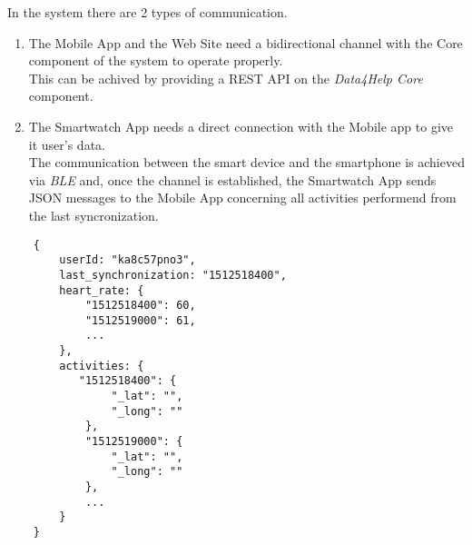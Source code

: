 
In the system there are 2 types of communication.
\begin{enumerate}
    \item The Mobile App and the Web Site need a bidirectional channel with the Core component of the system to operate properly. \\
    This can be achived by providing a REST API on the \textit{Data4Help Core} component.
    
    \item The Smartwatch App needs a direct connection with the Mobile app to give it user's data.\\ The communication between the smart device and the smartphone is achieved via \textit{BLE} and, once the channel is established, the Smartwatch App sends JSON messages to the Mobile App concerning all activities performend from the last syncronization.

\end{enumerate}

\begin{center}
    \begin{small}
    \begin{verbatim}
    {
        userId: "ka8c57pno3",
        last_synchronization: "1512518400",
        heart_rate: {
            "1512518400": 60,
            "1512519000": 61,
            ...
        },
        activities: {
           "1512518400": {
                "_lat": "",
                "_long": ""
            },
            "1512519000": {
                "_lat": "",
                "_long": ""
            },
            ...
        }
    }
    \end{verbatim}
    \end{small}
\end{center}

